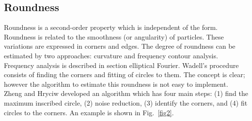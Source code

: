 \documentclass[conference]{IEEEtran}
\begin{document}
\subsection{Roundness}
Roundness is a second-order property which is independent of the form. Roundness is related to the smoothness (or angularity) of particles. These variations are expressed in corners and edges. The degree of roundness can be estimated by two approaches: curvature and frequency contour analysis. Frequency analysis is described in section elliptical Fourier. Wadell's procedure \cite{b6} consists of finding the corners and fitting of circles to them. The concept is clear; however the algorithm to estimate this roundness is not easy to implement. Zheng and Hryciw \cite{b7} developed an algorithm which has four main steps: (1) find the maximum inscribed circle, (2) noise reduction, (3) identify the corners, and (4) fit circles to the corners. An example is shown in Fig.~\ref{fig2}.
\end{document}
